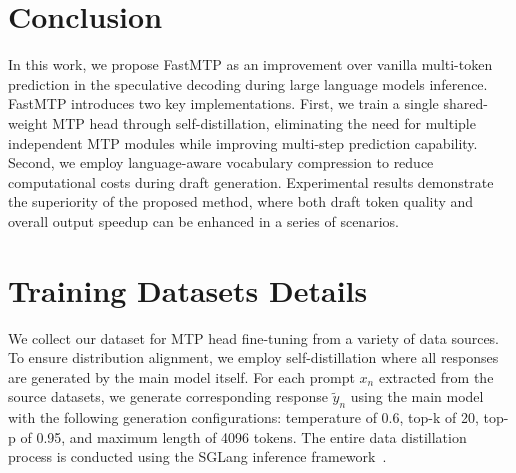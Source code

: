 \documentclass{article} %
\begin{document}



\section{Conclusion}

In this work, we propose FastMTP as an improvement over vanilla multi-token prediction in the speculative decoding during large language models inference. FastMTP introduces two key implementations. First, we train a single shared-weight MTP head through self-distillation, eliminating the need for multiple independent MTP modules while improving multi-step prediction capability. Second, we employ language-aware vocabulary compression to reduce computational costs during draft generation. Experimental results demonstrate the superiority of the proposed method, where both draft token quality and overall output speedup can be enhanced in a series of scenarios.





\newpage

\appendix


\section{Training Datasets Details} \label{app:train_data}

We collect our dataset for MTP head fine-tuning from a variety of data sources. To ensure distribution alignment, we employ self-distillation where all responses are generated by the main model itself. For each prompt $x_n$ extracted from the source datasets, we generate corresponding response $\tilde{y}_n$ using the main model with the following generation configurations: temperature of 0.6, top-k of 20, top-p of 0.95, and maximum length of 4096 tokens. The entire data distillation process is conducted using the SGLang inference framework~\citep{zheng2024sglang}. 
\end{document}
